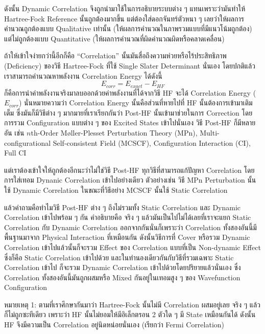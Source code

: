 ดังนั้น Dynamic Correlation จึงถูกนำมาใช้ในการอธิบายระบบต่าง ๆ แทนเพราะว่ามันทำให้ Hartree-Fock Reference นั้นถูกต้องมากขึ้น แต่ต้องใส่ดอกจันทร์ตัวหนา ๆ เลยว่าให้ผลการคำนวณถูกต้องแบบ Qualitative เท่านั้น (ให้ผลการคำนวณในภาพรวมแบบที่มีแนวโน้มถูกต้อง) แต่ไม่ถูกต้องแบบ Quantitative (ให้ผลการคำนวณที่ผิดคำนวณผิดหรือคลาดเคลื่อน)

ถ้าให้เข้าใจง่ายกว่านี้อีกก็คือ \enquote{Correlation} นั้นมันสื่อถึงความห่วยหรือไร้ประสิทธิภาพ (Deficiency) ของวิธี Hartree-Fock ที่ใช้ Single Slater Determinant นั่นเอง โดยปกติแล้วเราสามารถคำนวณหาพลังงาน Correlation Energy ได้ดังนี้
%
\begin{equation}
  E_{corr} 
  = 
  E_{exact} - E_{HF}
\end{equation}
%
ก็คือการนำค่าพลังงานจริงมาลบออกด้วยค่าพลังงานที่ได้จากวิธี HF จะได้ Correlation Energy ($E_{corr}$) นั่นหมายความว่า Correlation Energy นั้นคือส่วนที่หายไปที่ HF นั้นต้องการเข้ามาเติมเต็ม ซึ่งมันก็มีวิธีต่าง ๆ มากมายที่เราเรียกกันว่า Post-HF นั้นเข้ามาช่วยในการ Correction โดยการรวม Configuration แบบต่าง ๆ ของ Excited States เข้าไปนั่นเอง วิธี Post-HF ก็มีหลายอัน เช่น $n$th-Order Møller-Plesset Perturbation Theory (MPn), Multi-configurational Self-consistent Field (MCSCF), Configuration Interaction (CI), Full CI

แต่เราต้องเข้าใจให้ถูกต้องอีกนะว่าไม่ใช่วิธี Post-HF ทุกวิธีที่สามารถแก้ปัญหา Correlation โดยการใส่เทอม Dynanic Correlation เข้าไปอย่างเดียว ตัวอย่างเช่น วิธี MPn Perturbation นั้นใช้ Dynamic Correlation ในขณะที่วิธีอย่าง MCSCF นั้นใช้ Static Correlation

แล้วคำถามคือทำไมวิธี Post-HF ต่าง ๆ ถึงไม่รวมทั้ง Static Correlation และ Dynamic Correlation เข้าไปพร้อม ๆ กัน คำอธิบายคือ จริง ๆ แล้วมันเป็นไปไม่ได้เลยที่เราจะแยก Static Correlation กับ Dynamic Correlation ออกจากกันนั่นก็เพราะว่า Correlation ทั้งสองอันนี้มีพื้นฐานมาจาก Physical Interaction ที่เหมือนกัน ดังนั้นวิธีการที่ Cover หรือรวม Dynamic Correlation เข้าไปแล้วนั้นก็จะรวม Effect ของ Correlation แบบที่เป็น Non-dynamic Effect ซึ่งก็คือ Static Correlation เข้าไปด้วย และในทำนองเดียวกันกับวิธีที่รวมเฉพาะ Static Correlation เข้าไป ก็จะรวม Dynamic Correlation เข้าไปด้วยโดยปริยายแล้วนั่นเอง ซึ่ง Correlation ทั้งสองอันนี้มันถูกผสมหรือ Mixed กันอยู่ในเทอมสูง ๆ ของ Wavefunction Configuration

\noindent หมายเหตุ 1: ตามที่เราศึกษากันมาว่า Hartree-Fock นั้นไม่มี Correlation ผสมอยู่เลย จริง ๆ แล้วก็ไม่ถูกซะทีเดียว เพราะว่า HF นั้นไม่ยอมให้มีอิเล็กตรอน 2 ตัวใด ๆ มี State เหมือนกันได้ ดังนั้น HF จึงมีความเป็น Correlation อยู่นิดหน่อยนั่นเอง (เรียกว่า Fermi Correlation)

